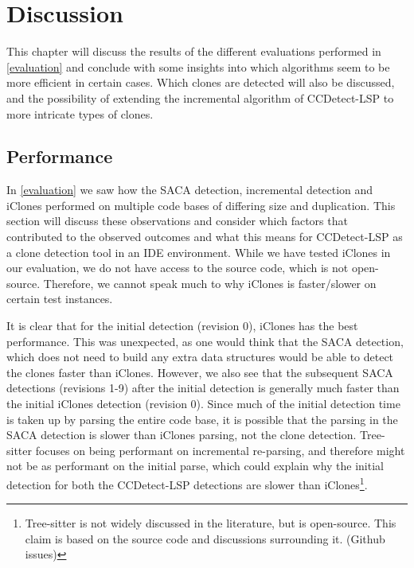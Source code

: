 \chapter{Discussion}

This chapter will discuss the results of the different evaluations performed in
\cref{evaluation} and conclude with some insights into which algorithms seem to be more
efficient in certain cases. Which clones are detected will also be discussed, and the
possibility of extending the incremental algorithm of CCDetect-LSP to more intricate types
of clones.

\section{Performance}

In \cref{evaluation} we saw how the SACA detection, incremental detection and iClones
performed on multiple code bases of differing size and duplication. This section will
discuss these observations and consider which factors that contributed to the observed
outcomes and what this means for CCDetect-LSP as a clone detection tool in an IDE
environment. While we have tested iClones in our evaluation, we do not have access to the
source code, which is not open-source. Therefore, we cannot speak much to why iClones is
faster/slower on certain test instances.

It is clear that for the initial detection (revision 0), iClones has the best performance.
This was unexpected, as one would think that the SACA detection, which does not need to
build any extra data structures would be able to detect the clones faster than iClones.
However, we also see that the subsequent SACA detections (revisions 1-9) after the initial
detection is generally much faster than the initial iClones detection (revision 0). Since
much of the initial detection time is taken up by parsing the entire code base, it is
possible that the parsing in the SACA detection is slower than iClones parsing, not the
clone detection. Tree-sitter focuses on being performant on incremental re-parsing, and
therefore might not be as performant on the initial parse, which could explain why the
initial detection for both the CCDetect-LSP detections are slower than
iClones\footnote{Tree-sitter is not widely discussed in the literature, but is
open-source. This claim is based on the source code and discussions surrounding it.
(Github issues)}.

